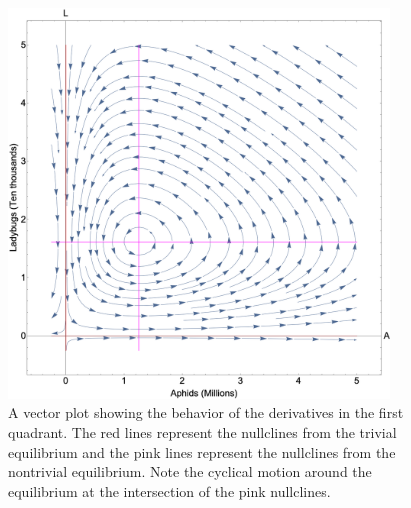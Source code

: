\documentclass[10pt]{article}
\newcommand{\np}{\vfill\newpage}
\begin{document}
\begin{figure}[h]
\centering
\includegraphics[width=0.9\textwidth]{basic_model_stream_plot.png}
\caption{A vector plot showing the behavior of the derivatives in the first quadrant. The red lines represent the nullclines from the trivial equilibrium and the pink lines represent the nullclines from the nontrivial equilibrium. Note the cyclical motion around the equilibrium at the intersection of the pink nullclines.}
\label{fig:basicmodelnullcline}
\end{figure}

\np
\end{document}
